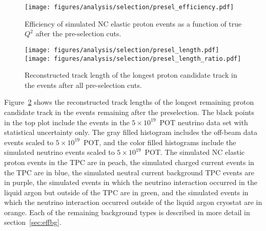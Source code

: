    \begin{figure}[ht]
      \centering
      \texttt{[image: figures/analysis/selection/presel\_efficiency.pdf]}
      \caption{Efficiency of simulated NC elastic proton events as a function
        of true $Q^2$ after the pre-selection cuts.}
      \label{fig:preseleff}
    \end{figure}
    \begin{figure}[ht]
      \centering
      \texttt{[image: figures/analysis/selection/presel\_length.pdf]} \\
      \texttt{[image: figures/analysis/selection/presel\_length\_ratio.pdf]}
      \caption{Reconstructed track length of the longest proton candidate track
      in the events after all pre-selection cuts.}
      \label{fig:presellength}
    \end{figure}

    Figure~\ref{fig:presellength} shows the reconstructed track lengths of the
    longest remaining proton candidate track in the events remaining after the
    preselection. The black points in the top plot include the events in the
    $5\times 10^{19}$~POT neutrino data set with statistical uncertainty only.
    The gray filled histogram includes the off-beam data events scaled to
    $5\times 10^{19}$~POT, and the color filled histograms include the
    simulated neutrino events scaled to $5\times 10^{19}$~POT. The simulated NC
    elastic proton events in the TPC are in peach, the simulated charged
    current events in the TPC are in blue, the simulated neutral current
    background TPC events are in purple, the simulated events in which the
    neutrino interaction occurred in the liquid argon but outside of the TPC
    are in green, and the simulated events in which the neutrino interaction
    occurred outside of the liquid argon cryostat are in orange.  Each of the
    remaining background types is described in more detail in
    section~\ref{sec:effbg}.

